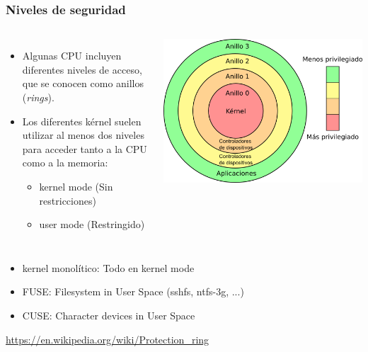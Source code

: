 \documentclass{beamer}
\begin{document}
\begin{frame} \frametitle{Niveles de seguridad}
  \begin{columns}
    \begin{itemize}
    \item Algunas CPU incluyen diferentes niveles de acceso, que se
      conocen como anillos (\emph{rings}).
    \item Los diferentes kérnel suelen utilizar al menos dos niveles
      para acceder tanto a la CPU como a la memoria:
      \begin{itemize}
      \item kernel mode (Sin restricciones)
      \item user mode (Restringido)
      \end{itemize}
    \end{itemize}
    \begin{center}
      \includegraphics[width=\columnwidth]{Priv_rings.png}
    \end{center}
  \end{columns}
    \begin{itemize}
    \item kernel monolítico: Todo en kernel mode
    \item FUSE: Filesystem in User Space (sshfs, ntfs-3g, ...)
    \item CUSE: Character devices in User Space
    \end{itemize}
    \footnotesize{\url{https://en.wikipedia.org/wiki/Protection_ring}}
\end{frame}
\end{document}
